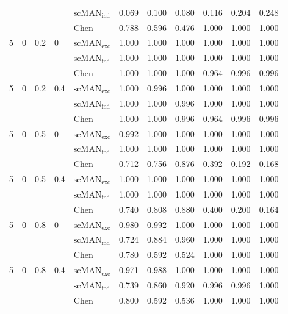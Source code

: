 \begin{table}[H]
\begin{tabular}{lllllllllll}
 &  &  &  & $\mathrm{scMAN}_{\mathrm{ind}}$ & 0.069 & 0.100 & 0.080 & 0.116 & 0.204 & 0.248 \\
 &  &  &  & Chen & 0.788 & 0.596 & 0.476 & 1.000 & 1.000 & 1.000 \\
5 & 0 & 0.2 & 0 & $\mathrm{scMAN}_{\mathrm{exc}}$ & 1.000 & 1.000 & 1.000 & 1.000 & 1.000 & 1.000 \\
 &  &  &  & $\mathrm{scMAN}_{\mathrm{ind}}$ & 1.000 & 1.000 & 1.000 & 1.000 & 1.000 & 1.000 \\
 &  &  &  & Chen & 1.000 & 1.000 & 1.000 & 0.964 & 0.996 & 0.996 \\
5 & 0 & 0.2 & 0.4 & $\mathrm{scMAN}_{\mathrm{exc}}$ & 1.000 & 0.996 & 1.000 & 1.000 & 1.000 & 1.000 \\
 &  &  &  & $\mathrm{scMAN}_{\mathrm{ind}}$ & 1.000 & 1.000 & 0.996 & 1.000 & 1.000 & 1.000 \\
 &  &  &  & Chen & 1.000 & 1.000 & 0.996 & 0.964 & 0.996 & 0.996 \\
5 & 0 & 0.5 & 0 & $\mathrm{scMAN}_{\mathrm{exc}}$ & 0.992 & 1.000 & 1.000 & 1.000 & 1.000 & 1.000 \\
 &  &  &  & $\mathrm{scMAN}_{\mathrm{ind}}$ & 1.000 & 1.000 & 1.000 & 1.000 & 1.000 & 1.000 \\
 &  &  &  & Chen & 0.712 & 0.756 & 0.876 & 0.392 & 0.192 & 0.168 \\
5 & 0 & 0.5 & 0.4 & $\mathrm{scMAN}_{\mathrm{exc}}$ & 1.000 & 1.000 & 1.000 & 1.000 & 1.000 & 1.000 \\
 &  &  &  & $\mathrm{scMAN}_{\mathrm{ind}}$ & 1.000 & 1.000 & 1.000 & 1.000 & 1.000 & 1.000 \\
 &  &  &  & Chen & 0.740 & 0.808 & 0.880 & 0.400 & 0.200 & 0.164 \\
5 & 0 & 0.8 & 0 & $\mathrm{scMAN}_{\mathrm{exc}}$ & 0.980 & 0.992 & 1.000 & 1.000 & 1.000 & 1.000 \\
 &  &  &  & $\mathrm{scMAN}_{\mathrm{ind}}$ & 0.724 & 0.884 & 0.960 & 1.000 & 1.000 & 1.000 \\
 &  &  &  & Chen & 0.780 & 0.592 & 0.524 & 1.000 & 1.000 & 1.000 \\
5 & 0 & 0.8 & 0.4 & $\mathrm{scMAN}_{\mathrm{exc}}$ & 0.971 & 0.988 & 1.000 & 1.000 & 1.000 & 1.000 \\
 &  &  &  & $\mathrm{scMAN}_{\mathrm{ind}}$ & 0.739 & 0.860 & 0.920 & 0.996 & 0.996 & 1.000 \\
 &  &  &  & Chen & 0.800 & 0.592 & 0.536 & 1.000 & 1.000 & 1.000 \\
\hline
\end{tabular}
\end{table}
